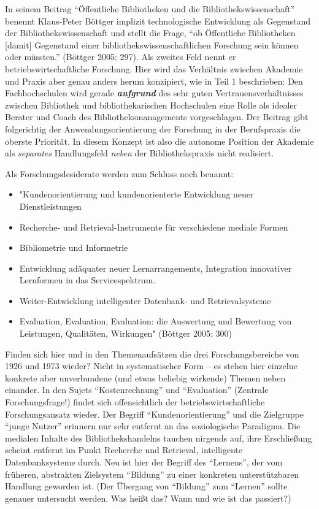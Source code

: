 \documentclass[a4paper,
fontsize=11pt,
oneside,
numbers=noperiodatend,
parskip=half-,
bibliography=totoc,
final
]{scrartcl}
\begin{document}
In seinem Beitrag \enquote{Öffentliche Bibliotheken und die
Bibliothekswissenschaft} benennt Klaus-Peter Böttger implizit
technologische Entwicklung als Gegenstand der Bibliothekswissenschaft
und stellt die Frage, \enquote{ob Öffentliche Bibliotheken {[}damit{]}
Gegenstand einer bibliothekswissenschaftlichen Forschung sein können
oder müssten.} (Böttger 2005: 297). Als zweites Feld nennt er
betriebswirtschaftliche Forschung. Hier wird das Verhältnis zwischen
Akademie und Praxis aber genau anders herum konzipiert, wie in Teil 1
beschrieben: Den Fachhochschulen wird gerade \textbf{\emph{aufgrund}}
des sehr guten Vertrauensverhältnisses zwischen Bibliothek und
bibliothekarischen Hochschulen eine Rolle als idealer Berater und Coach
des Bibliotheksmanagements vorgeschlagen. Der Beitrag gibt folgerichtig
der Anwendungsorientierung der Forschung in der Berufspraxis die oberste
Priorität. In diesem Konzept ist also die autonome Position der Akademie
als \emph{separates} Handlungsfeld \emph{neben} der Bibliothekspraxis
nicht realisiert.

Als Forschungsdesiderate werden zum Schluss noch benannt:

\begin{itemize}
\item
  "Kundenorientierung und kundenorienterte Entwicklung neuer
  Dienstleistungen
\item
  Recherche- und Retrieval-Instrumente für verschiedene mediale Formen
\item
  Bibliometrie und Informetrie
\item
  Entwicklung adäquater neuer Lernarrangements, Integration innovativer
  Lernformen in das Servicespektrum.
\item
  Weiter-Entwicklung intelligenter Datenbank- und Retrievalsysteme
\item
  Evaluation, Evaluation, Evaluation: die Auswertung und Bewertung von
  Leistungen, \linebreak Qualitäten, Wirkungen" (Böttger 2005: 300)
\end{itemize}

Finden sich hier und in den Themenaufsätzen die drei Forschungsbereiche
von 1926 und 1973 wieder? Nicht in systematischer Form -- es stehen hier
einzelne konkrete aber unverbundene (und etwas beliebig wirkende) Themen
neben einander. In den Sujets \enquote{Kostenrechnung} und
\enquote{Evaluation} (Zentrale Forschungsfrage!) findet sich
offensichtlich der betriebswirtschaftliche Forschungsansatz wieder. Der
Begriff \enquote{Kundenorientierung} und die Zielgruppe \enquote{junge
Nutzer} erinnern nur sehr entfernt an das soziologische Paradigma. Die
medialen Inhalte des Bibliothekshandelns tauchen nirgends auf, ihre
Erschließung scheint entfernt im Punkt Recherche und Retrieval,
intelligente Datenbanksysteme durch. Neu ist hier der Begriff des
\enquote{Lernens}, der vom früheren, abstrakten Zielsystem
\enquote{Bildung} zu einer konkreten unterstützbaren Handlung geworden
ist. (Der Übergang von \enquote{Bildung} zum \enquote{Lernen} sollte
genauer untersucht werden. Was heißt das? Wann und wie ist das
passiert?)
\end{document}
